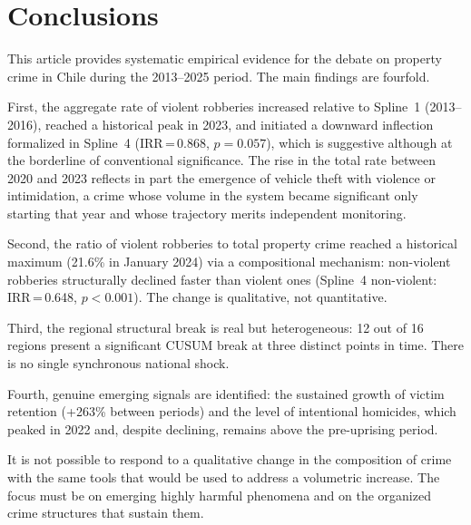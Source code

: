 \documentclass[pdflatex,sn-basic]{sn-jnl}
\begin{document}
\section{Conclusions}
\label{sec:conclusiones}

This article provides systematic empirical evidence for the debate on
property crime in Chile during the 2013--2025 period. The main
findings are fourfold.

First, the aggregate rate of violent robberies increased relative to Spline~1
(2013--2016), reached a historical peak in 2023, and initiated a downward
inflection formalized in Spline~4 (IRR\,=\,0.868, $p=0.057$), which is
suggestive although at the borderline of conventional significance. The rise in the total rate between 2020 and 2023 reflects in part the
emergence of vehicle theft with violence or intimidation, a crime whose volume
in the system became significant only starting that year and whose trajectory merits
independent monitoring.

Second, the ratio of violent robberies to total property crime reached a historical
maximum (21.6\% in January 2024) via a compositional mechanism: non-violent
robberies structurally declined faster than violent ones (Spline~4 non-violent:
IRR\,=\,0.648, $p<0.001$). The change is qualitative, not quantitative.

Third, the regional structural break is real but heterogeneous: 12 out of 16 regions
present a significant CUSUM break at three distinct points in time. There is no
single synchronous national shock.

Fourth, genuine emerging signals are identified: the sustained growth of
victim retention (+263\% between periods) and the level of intentional
homicides, which peaked in 2022 and, despite declining, remains above the
pre-uprising period.

It is not possible to respond to a qualitative change in the composition of crime with the
same tools that would be used to address a volumetric increase. The focus
must be on emerging highly harmful phenomena and on the organized
crime structures that sustain them.

\newpage



\newpage
\appendix
\end{document}
